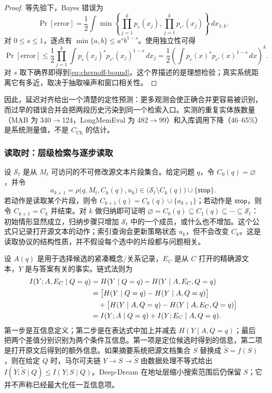 \begin{proof}
等先验下，Bayes 错误为
\[
\Pr[\mathrm{error}]
=\frac12\int \min\!\left\{\prod_{j=1}^{k}p_e(x_j),
\prod_{j=1}^{k}p_{e'}(x_j)\right\}\,d x_{1:k}.
\]
对 $0\le s\le1$，逐点有 $\min\{a,b\}\le a^s b^{1-s}$。使用独立性可得
\[
\Pr[\mathrm{error}]
\le \frac12\prod_{j=1}^{k}
\int p_e(x_j)^s p_{e'}(x_j)^{1-s}\,dx_j
=\frac12\left(\int p_e(x)^s p_{e'}(x)^{1-s}\,dx\right)^k.
\]
对 $s$ 取下确界即得到\cref{eq:chernoff-bound}。这个界描述的是理想检验；真实系统距离它有多近，取决于抽取噪声和窗口相关性。
\end{proof}

因此，延迟对齐给出一个清楚的定性预测：更多观测会使正确合并更容易被识别，而过早的错误合并会把两段历史污染到同一个检索入口。实测的重复实体族数量（MAB 为 340$\to$124，LongMemEval 为 482$\to$99）和入库调用下降（46--65\%）是系统测量值，不是 $C_{\mathrm{Ch}}$ 的估计。

\subsubsection{读取时：层级检索与逐步读取}

设 $\mathcal S_t$ 是从 $M_t$ 可访问的不可修改源文本片段集合。给定问题 $q$，令 $C_0(q)=\varnothing$，并令
\[
a_{k+1}=\rho\bigl(q,M_t,C_k(q),u_k\bigr)
\in\bigl(\mathcal S_t\setminus C_k(q)\bigr)\cup\{\mathsf{stop}\}.
\]
若动作是读取某个片段，则令 $C_{k+1}(q)=C_k(q)\cup\{a_{k+1}\}$；若动作是 $\mathsf{stop}$，则令 $C_{k+1}=C_k$ 并结束。对 $k$ 做归纳即可证明
$\varnothing=C_0(q)\subseteq C_1(q)\subseteq\cdots\subseteq\mathcal S_t$：初始情形显然成立，归纳步骤只增加 $\mathcal S_t$ 中的一个成员，或什么也不增加。这个公式只记录打开源文本的动作；索引查询会更新策略状态 $u_k$，但不会改变 $C_k$。这是读取协议的结构性质，并不假设每个选中的片段都与问题相关。

设 $A(q)$ 是用于选择候选的紧凑概念/关系记录，$E_C$ 是从 $C$ 打开的精确源文本，$Y$ 是与答案有关的事实。链式法则为
\begin{align}
I(Y;A,E_C\mid Q=q)
&=H(Y\mid Q=q)-H(Y\mid A,E_C,Q=q)\notag\\
&=\bigl[H(Y\mid Q=q)-H(Y\mid A,Q=q)\bigr]\notag\\
&\quad+\bigl[H(Y\mid A,Q=q)-H(Y\mid A,E_C,Q=q)\bigr]\notag\\
&=I(Y;A\mid Q=q)+I(Y;E_C\mid A,Q=q).
\label{eq:appendix-two-rate}
\end{align}
第一步是互信息定义；第二步是在表达式中加上并减去 $H(Y\mid A,Q=q)$；最后把两个差值分别识别为两个条件互信息。第一项是定位候选时得到的信息，第二项是打开原文后得到的额外信息。如果摘要系统把源文档集合 $S$ 替换成 $\widetilde S=f(S)$，则在给定 $Q$ 时，马尔可夫链 $Y\to S\to\widetilde S$ 由数据处理不等式给出 $I(Y;\widetilde S\mid Q)\le I(Y;S\mid Q)$。Deep-Dream 在地址层缩小搜索范围后仍保留 $S$；它并不声称已经最大化任一互信息项。

